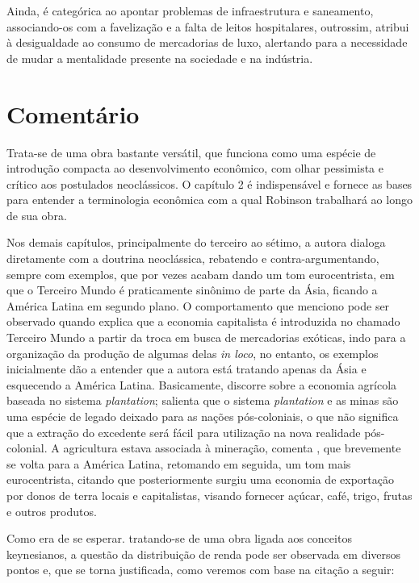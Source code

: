 	Ainda, é categórica ao apontar problemas de infraestrutura e saneamento, associando-os com a favelização e a falta de leitos hospitalares, outrossim, atribui à desigualdade ao consumo de mercadorias de luxo, alertando para a necessidade de mudar a mentalidade presente na sociedade e na indústria.
	
	\chapter{Comentário}
	
	Trata-se de uma obra bastante versátil, que funciona como uma espécie de introdução compacta ao desenvolvimento econômico, com olhar pessimista e crítico aos postulados neoclássicos. O capítulo 2 é indispensável e fornece as bases para entender a terminologia econômica com a qual Robinson trabalhará ao longo de sua obra.
	
	Nos demais capítulos, principalmente do terceiro ao sétimo, a autora dialoga diretamente com a doutrina neoclássica, rebatendo e contra-argumentando, sempre com exemplos, que por vezes acabam dando um tom eurocentrista, em que o Terceiro Mundo é praticamente sinônimo de parte da Ásia, ficando a América Latina em segundo plano. O comportamento que menciono pode ser observado quando  explica que a economia capitalista é introduzida no chamado Terceiro Mundo a partir da troca em busca de mercadorias exóticas, indo para a organização da produção de algumas delas \textit{in loco}, no entanto, os exemplos inicialmente dão a entender que a autora está tratando apenas da Ásia e esquecendo a América Latina. Basicamente,  discorre sobre a economia agrícola baseada no sistema \textit{plantation}; salienta que o sistema \textit{plantation} e as minas são uma espécie de legado deixado para as nações pós-coloniais, o que não significa que a extração do excedente será fácil para utilização na nova realidade pós-colonial. A agricultura estava associada à mineração, comenta , que brevemente se volta para a América Latina, retomando em seguida, um tom mais eurocentrista, citando que posteriormente surgiu uma economia de exportação por donos de terra locais e capitalistas, visando fornecer açúcar, café, trigo, frutas e outros produtos.
	
	Como era de se esperar. tratando-se de uma obra ligada aos conceitos keynesianos, a questão da distribuição de renda pode ser observada em diversos pontos e, que se torna justificada, como veremos com base na citação a seguir:
	
